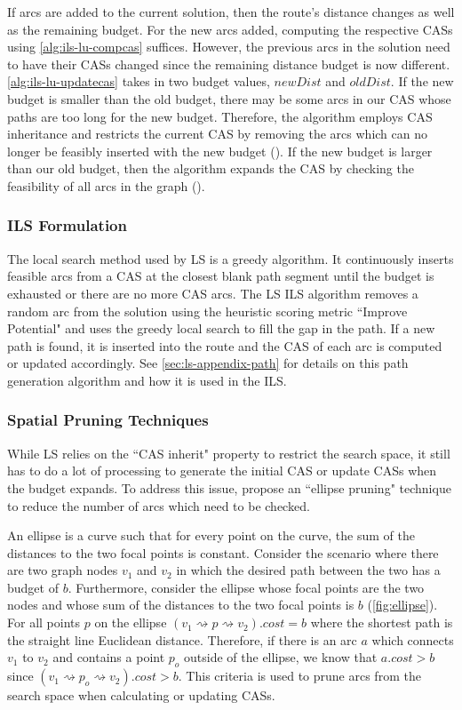\documentclass[honors]{union-cs-thesis}
\newcommand{\spa}{\rightsquigarrow}
\newcommand{\td}{\todo[inline]}
\begin{document}
If arcs are added to the current solution, then the route's distance changes as well as the remaining budget. For the new arcs added, computing the respective CASs using \cref{alg:ils-lu-compcas} suffices. However, the previous arcs in the solution need to have their CASs changed since the remaining distance budget is now different. \cref{alg:ils-lu-updatecas} takes in two budget values, $newDist$ and $oldDist$. If the new budget is smaller than the old budget, there may be some arcs in our CAS whose paths are too long for the new budget. Therefore, the algorithm employs CAS inheritance and restricts the current CAS by removing the arcs which can no longer be feasibly inserted with the new budget (). If the new budget is larger than our old budget, then the algorithm expands the CAS by checking the feasibility of all arcs in the graph ().



\subsubsection{ILS Formulation}
The local search method used by LS is a greedy algorithm. It continuously inserts feasible arcs from a CAS at the closest blank path segment until the budget is exhausted or there are no more CAS arcs. The LS ILS algorithm removes a random arc from the solution using the heuristic scoring metric ``Improve Potential" and uses the greedy local search to fill the gap in the path. If a new path is found, it is inserted into the route and the CAS of each arc is computed or updated accordingly. See \cref{sec:ls-appendix-path} for details on this path generation algorithm and how it is used in the ILS. 


\subsubsection{Spatial Pruning Techniques}\label{sec:pruning}
While LS relies on the ``CAS inherit" property to restrict the search space, it still has to do a lot of processing to generate the initial CAS or update CASs when the budget expands. To address this issue,  \citeauthor{lu2015arc} propose an ``ellipse pruning" technique to reduce the number of arcs which need to be checked.


An ellipse is a curve such that for every point on the curve, the sum of the distances to the two focal points is constant. Consider the scenario where there are two graph nodes $v_1$ and $v_2$ in which the desired path between the two has a budget of $b$. Furthermore, consider the ellipse whose focal points are the two nodes and whose sum of the distances to the two focal points is $b$ (\cref{fig:ellipse}). For all points $p$ on the ellipse $(v_1 \spa p \spa v_2).cost = b$ where the shortest path is the straight line Euclidean distance. Therefore, if there is an arc $a$ which connects $v_1$ to $v_2$ and contains a point $p_o$ outside of the ellipse, we know that $a.cost > b$ since $(v_1 \spa p_o \spa v_2).cost > b$. This criteria is used to prune arcs from the search space when calculating or updating CASs.
\end{document}

